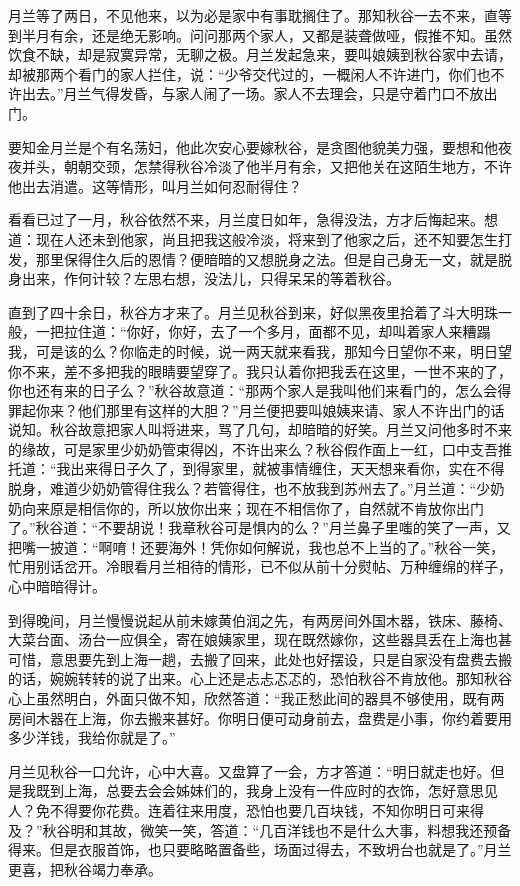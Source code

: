 \documentclass[12pt,UTF8]{ctexbook}
\begin{document}
{{{月兰等了两日，不见他来，以为必是家中有事耽搁住了。那知秋谷一去不来，直等到半月有余，还是绝无影响。问问那两个家人，又都是装聋做哑，假推不知。虽然饮食不缺，却是寂寞异常，无聊之极。月兰发起急来，要叫娘姨到秋谷家中去请，却被那两个看门的家人拦住，说：“少爷交代过的，一概闲人不许进门，你们也不许出去。”月兰气得发昏，与家人闹了一场。家人不去理会，只是守着门口不放出门。

要知金月兰是个有名荡妇，他此次安心要嫁秋谷，是贪图他貌美力强，要想和他夜夜并头，朝朝交颈，怎禁得秋谷冷淡了他半月有余，又把他关在这陌生地方，不许他出去消遣。这等情形，叫月兰如何忍耐得住？

看看已过了一月，秋谷依然不来，月兰度日如年，急得没法，方才后悔起来。想道：现在人还未到他家，尚且把我这般冷淡，将来到了他家之后，还不知要怎生打发，那里保得住久后的恩情？便暗暗的又想脱身之法。但是自己身无一文，就是脱身出来，作何计较？左思右想，没法儿，只得呆呆的等着秋谷。

直到了四十余日，秋谷方才来了。月兰见秋谷到来，好似黑夜里拾着了斗大明珠一般，一把拉住道：“你好，你好，去了一个多月，面都不见，却叫着家人来糟蹋我，可是该的么？你临走的时候，说一两天就来看我，那知今日望你不来，明日望你不来，差不多把我的眼睛要望穿了。我只认着你把我丢在这里，一世不来的了，你也还有来的日子么？”秋谷故意道：“那两个家人是我叫他们来看门的，怎么会得罪起你来？他们那里有这样的大胆？”月兰便把要叫娘姨来请、家人不许出门的话说知。秋谷故意把家人叫将进来，骂了几句，却暗暗的好笑。月兰又问他多时不来的缘故，可是家里少奶奶管束得凶，不许出来么？秋谷假作面上一红，口中支吾推托道：“我出来得日子久了，到得家里，就被事情缠住，天天想来看你，实在不得脱身，难道少奶奶管得住我么？若管得住，也不放我到苏州去了。”月兰道：“少奶奶向来原是相信你的，所以放你出来；现在不相信你了，自然就不肯放你出门了。”秋谷道：“不要胡说！我章秋谷可是惧内的么？”月兰鼻子里嗤的笑了一声，又把嘴一披道：“啊唷！还要海外！凭你如何解说，我也总不上当的了。”秋谷一笑，忙用别话岔开。冷眼看月兰相待的情形，已不似从前十分熨帖、万种缠绵的样子，心中暗暗得计。

到得晚间，月兰慢慢说起从前未嫁黄伯润之先，有两房间外国木器，铁床、藤椅、大菜台面、汤台一应俱全，寄在娘姨家里，现在既然嫁你，这些器具丢在上海也甚可惜，意思要先到上海一趟，去搬了回来，此处也好摆设，只是自家没有盘费去搬的话，婉婉转转的说了出来。心上还是忐忐忑忑的，恐怕秋谷不肯放他。那知秋谷心上虽然明白，外面只做不知，欣然答道：“我正愁此间的器具不够使用，既有两房间木器在上海，你去搬来甚好。你明日便可动身前去，盘费是小事，你约着要用多少洋钱，我给你就是了。”

月兰见秋谷一口允许，心中大喜。又盘算了一会，方才答道：“明日就走也好。但是我既到上海，总要去会会姊妹们的，我身上没有一件应时的衣饰，怎好意思见人？免不得要你花费。连着往来用度，恐怕也要几百块钱，不知你明日可来得及？”秋谷明和其故，微笑一笑，答道：“几百洋钱也不是什么大事，料想我还预备得来。但是衣服首饰，也只要略略置备些，场面过得去，不致坍台也就是了。”月兰更喜，把秋谷竭力奉承。

}}}
\end{document}
